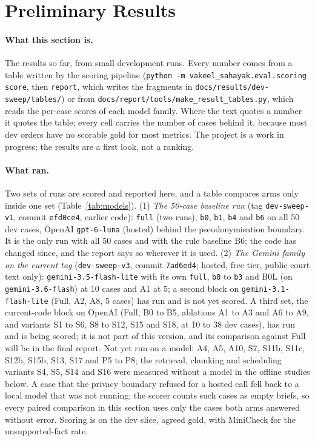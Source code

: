 \section{Preliminary Results}
\label{sec:results}

\paragraph{What this section is.} The results so far, from small development runs. Every number comes from a table written by the scoring pipeline (\texttt{python -m vakeel\_sahayak.eval.scoring score}, then \texttt{report}, which writes the fragments in \texttt{docs/results/dev-sweep/tables/}) or from \texttt{docs/report/tools/make\_result\_tables.py}, which reads the per-case scores of each model family. Where the text quotes a number it quotes the table; every cell carries the number of cases behind it, because most dev orders have no scorable gold for most metrics. The project is a work in progress; the results are a first look, not a ranking.

\paragraph{What ran.} Two sets of runs are scored and reported here, and a table compares arms only inside one set (Table~\ref{tab:models}). (1) \emph{The 50-case baseline run} (tag \texttt{dev-sweep-v1}, commit \texttt{efd0ce4}, earlier code): \texttt{full} (two runs), \texttt{b0}, \texttt{b1}, \texttt{b4} and \texttt{b6} on all 50 dev cases, OpenAI \texttt{gpt-6-luna} (hosted) behind the pseudonymisation boundary. It is the only run with all 50 cases and with the rule baseline B6; the code has changed since, and the report says so wherever it is used. (2) \emph{The Gemini family on the current tag} (\texttt{dev-sweep-v3}, commit \texttt{7ad6ed4}; hosted, free tier, public court text only): \texttt{gemini-3.5-flash-lite} with its own \texttt{full}, \texttt{b0} to \texttt{b3} and B0L (on \texttt{gemini-3.6-flash}) at 10 cases and A1 at 5; a second block on \texttt{gemini-3.1-flash-lite} (Full, A2, A8, 5 cases) has run and is not yet scored. A third set, the current-code block on OpenAI (Full, B0 to B5, ablations A1 to A3 and A6 to A9, and variants S1 to S6, S8 to S12, S15 and S18, at 10 to 38 dev cases), has run and is being scored; it is not part of this version, and its comparison against Full will be in the final report. Not yet run on a model: A4, A5, A10, S7, S11b, S11c, S12b, S15b, S13, S17 and P5 to P8; the retrieval, chunking and scheduling variants S4, S5, S14 and S16 were measured without a model in the offline studies below. A case that the privacy boundary refused for a hosted call fell back to a local model that was not running; the scorer counts such cases as empty briefs, so every paired comparison in this section uses only the cases both arms answered without error. Scoring is on the dev slice, agreed gold, with MiniCheck for the unsupported-fact rate.

